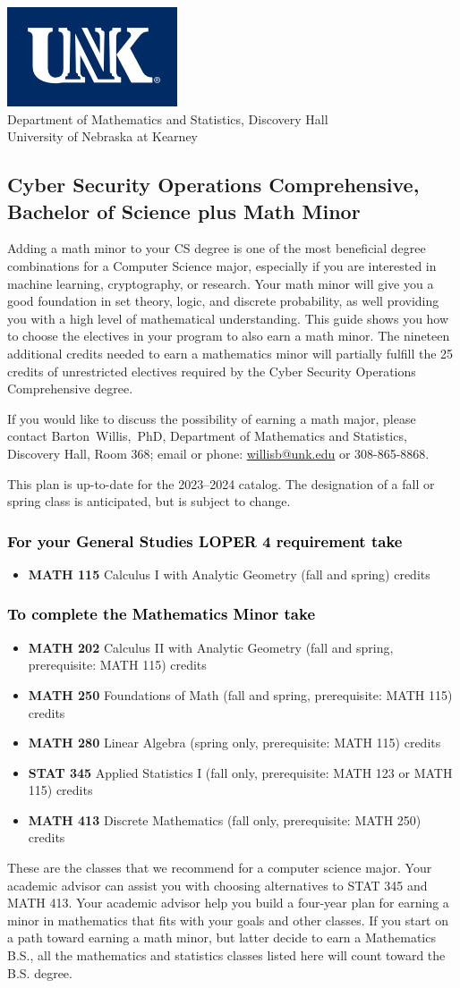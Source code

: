\documentclass[11pt]{article}
\makeatletter
\newcommand{\calcone}{\textbf{MATH 115} Calculus I with Analytic Geometry (fall and spring) \dotfill 5 credits}
\newcommand{\calctwo}{\textbf{MATH 202} Calculus II with Analytic Geometry (fall and spring, prerequisite: MATH 115) \dotfill 5 credits }
\newcommand{\foundations}{\textbf{MATH 250} Foundations of Math (fall and spring, prerequisite: MATH 115)  \dotfill 3 credits}
\newcommand{\linear}{\textbf{MATH 280} Linear Algebra (spring only, prerequisite: MATH 115) \dotfill 3 credits}
\newcommand{\discrete}{\textbf{MATH 413} Discrete Mathematics  (fall only, prerequisite: MATH 250)\dotfill 3 credits}
\newcommand{\discreteshort}{MATH 413}
\newcommand{\appliedstat}{\textbf{STAT 345} Applied Statistics I (fall only, prerequisite: MATH 123 or MATH 115) \dotfill 3 credits}
\newcommand{\appliedstatshort}{STAT 345}
\newcommand{\contactbw}{\mbox{Barton Willis, PhD}, Department of Mathematics and Statistics,  Discovery Hall, Room 368;
email or phone: \href{mailto:willisb@unk.edu}{willisb@unk.edu} or 308-865-8868.}
\newcommand{\forinfo}[2]{If you would like to discuss the possibility of earning a math {#1}, please contact \contactbw}
\newcommand{\catalog}{2023--2024 }
\newcommand{\LOPER}{LOPER\xspace}
\newcommand{\uptodate}{This plan is up-to-date for  the \catalog catalog. The designation of a fall or spring class is 
anticipated, but  is subject to change.}
\newcommand{\myheading}{
\begin{flushleft}
\includegraphics[scale=0.35]{unk-logo}\\
\setcounter{footnote}{0}
\vspace{0.25in}
 \textcolor{unkblue}{Department of Mathematics and Statistics, Discovery Hall} \\
  \textcolor{unkblue}{University of Nebraska at Kearney}
\end{flushleft}}
\makeatother
\begin{document}
\vfill 
\newpage



\myheading

\subsection*{\textbf{\textcolor{unkblue}{Cyber Security Operations Comprehensive, Bachelor of Science plus Math Minor}}}

Adding a math minor to your CS degree is one of the most beneficial degree combinations 
for a Computer Science major, especially if you are interested in machine learning, 
cryptography,  or research.  Your math minor will give you a good foundation in 
set theory, logic, and discrete probability, as well providing you with a high level of 
mathematical understanding. This guide shows you how to choose the electives in your program to also 
earn a math minor. The nineteen additional credits needed to earn a mathematics minor 
will partially fulfill the 25 credits of unrestricted electives required by the 
Cyber Security Operations Comprehensive degree.

 
 \forinfo{major}{Cyber Security Operations Comprehensive}

\uptodate
\vspace{-0.1in}

\subsubsection*{\textcolor{black}{For  your General Studies \LOPER 4 requirement take}}
\begin{itemize}
\item  \calcone
\end{itemize}

\subsubsection*{\textcolor{black}{To complete the Mathematics Minor take}}

\begin{itemize}
\item \calctwo
\item \foundations
\item \linear
\item \appliedstat
\item \discrete
\end{itemize}
\vspace{0.1in}
These are the classes that we recommend for a computer science major.
Your academic advisor can assist you with choosing alternatives 
to \appliedstatshort{} and \discreteshort{}. Your academic advisor help you build a four-year plan for earning 
a minor in mathematics that fits with your goals and other classes.  
If you start on a path toward earning a math minor, but latter decide to earn a  
Mathematics B.S., all the mathematics and statistics  
classes listed here will count toward the B.S. degree.
\end{document}
